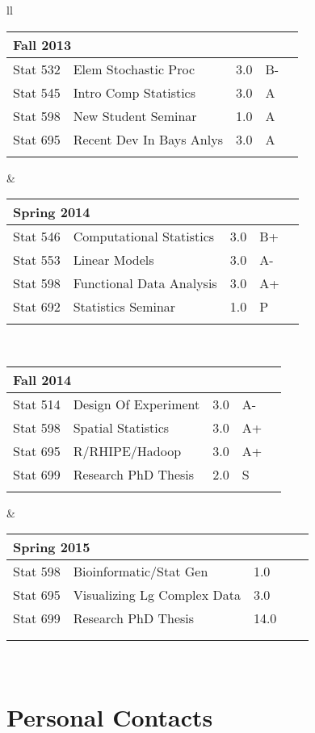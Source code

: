 \documentclass[oneside]{article}
\newcommand{\semtable}[1]{
  \begin{tabular}{p{1.5cm} p{3.5cm} p{.3cm} p{.3cm} p{0.75cm}}
    \multicolumn{5}{l}{#1}\\
    \hline
}
\newcommand{\semtableend}{
  \\
  \end{tabular}
}
\begin{document}
{\begin{tabular}{ll}
    \semtable{Fall 2013}
      Stat 532 & Elem Stochastic Proc &  3.0 & B- & \\
      Stat 545 & Intro Comp Statistics & 3.0 & A & \\
      Stat 598 & New Student Seminar & 1.0 & A & \\
      Stat 695 & Recent Dev In Bays Anlys & 3.0 & A & \\	
    \semtableend
    &
    \semtable{Spring 2014}
      Stat 546 & Computational Statistics & 3.0 & B+ & \\
      Stat 553 & Linear Models & 3.0 & A- & \\
      Stat 598 & Functional Data Analysis & 3.0 & A+ & \\
      Stat 692 & Statistics Seminar & 1.0 & P & \\
    \semtableend
    \\

    \semtable{Fall 2014}
      Stat 514 & Design Of Experiment & 3.0 & A- & \\
      Stat 598 & Spatial Statistics & 3.0 & A+ & \\
      Stat 695 & R/RHIPE/Hadoop & 3.0 & A+ & \\
      Stat 699 & Research PhD Thesis & 2.0 & S & \\
    \semtableend
    &
    \semtable{Spring 2015}
      Stat 598 & Bioinformatic/Stat Gen & 1.0 &  & \\	
      Stat 695 & Visualizing Lg Complex Data & 3.0 &  & \\
      Stat 699 & Research PhD Thesis & 14.0 &  & \\
      \\
    \semtableend
    \\



  \end{tabular}
} %


\newpage
\section{Personal Contacts}
\end{document}
